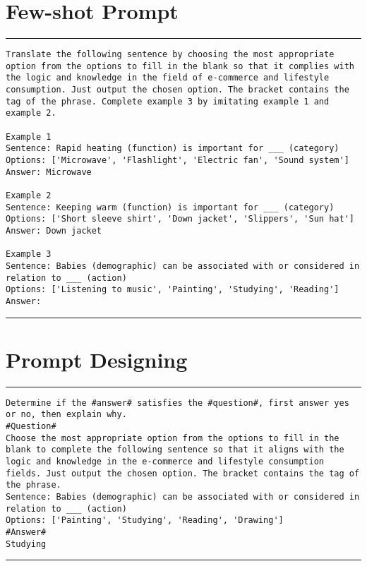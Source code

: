 \section{Few-shot Prompt}
\label{sec:appendix}

\noindent\rule{0.45\textwidth}{0.4pt}
\begin{lstlisting}
Translate the following sentence by choosing the most appropriate option from the options to fill in the blank so that it complies with the logic and knowledge in the field of e-commerce and lifestyle consumption. Just output the chosen option. The bracket contains the tag of the phrase. Complete example 3 by imitating example 1 and example 2.

Example 1
Sentence: Rapid heating (function) is important for ___ (category)
Options: ['Microwave', 'Flashlight', 'Electric fan', 'Sound system']
Answer: Microwave

Example 2
Sentence: Keeping warm (function) is important for ___ (category)
Options: ['Short sleeve shirt', 'Down jacket', 'Slippers', 'Sun hat']
Answer: Down jacket

Example 3
Sentence: Babies (demographic) can be associated with or considered in relation to ___ (action)
Options: ['Listening to music', 'Painting', 'Studying', 'Reading']
Answer:
\end{lstlisting}
\noindent\rule{0.45\textwidth}{0.4pt}


\section{Prompt Designing}
\noindent\rule{0.45\textwidth}{0.4pt}
\begin{lstlisting}
Determine if the #answer# satisfies the #question#, first answer yes or no, then explain why.
#Question#
Choose the most appropriate option from the options to fill in the blank to complete the following sentence so that it aligns with the logic and knowledge in the e-commerce and lifestyle consumption fields. Just output the chosen option. The bracket contains the tag of the phrase.
Sentence: Babies (demographic) can be associated with or considered in relation to ___ (action)
Options: ['Painting', 'Studying', 'Reading', 'Drawing']
#Answer#
Studying
\end{lstlisting}
\noindent\rule{0.45\textwidth}{0.4pt}

